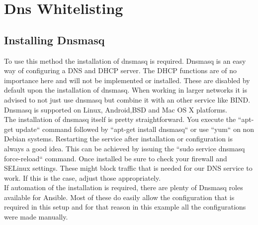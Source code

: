 \section{Dns Whitelisting}
\subsection{Installing Dnsmasq}
To use this method the installation of dnsmasq is required. Dnsmasq is an easy way of configuring a DNS and DHCP server. The DHCP functions are of no importance here and will not be implemented or installed. These are disabled by default upon the installation of dnsmasq. When working in larger networks it is advised to not just use dnsmasq but combine it with an other service like BIND. Dnsmasq is supported on Linux, Android,BSD and Mac OS X platforms.\\

 The installation of dnsmasq itself is pretty straightforward. You execute the ``apt-get update`` command followed by ``apt-get install dnsmasq`` or use ``yum`` on non Debian systems. Restarting the service after installation or configuration is always a good idea. This can be achieved by issuing the ``sudo service dnsmasq force-reload`` command. Once installed be sure to check your firewall and SELinux settings. These might block traffic that is needed for our DNS service to work. If this is the case, adjust those appropriately. \\
 
If automation of the installation is required, there are plenty of Dnsmasq roles available for Ansible. Most of these do easily allow the configuration that is required in this setup and for that reason in this example all the configurations were made manually.
